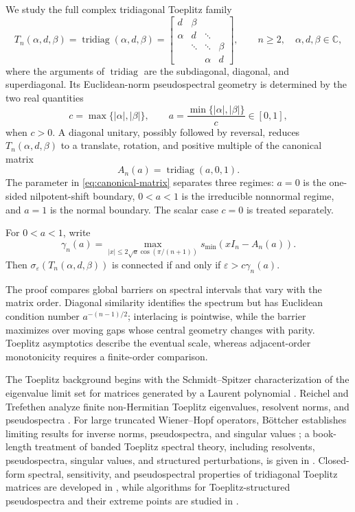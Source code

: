 \documentclass[11pt,a4paper]{article}
\numberwithin{equation}{section}
\DeclareMathOperator{\tridiag}{tridiag}
\newcommand{\C}{\mathbb C}
\begin{document}
We study the full complex tridiagonal Toeplitz family
\begin{equation}\label{eq:A-matrix}
 T_n(\alpha,d,\beta)=\tridiag(\alpha,d,\beta)
 =\begin{bmatrix}
 d&\beta\\
 \alpha&d&\ddots\\
 &\ddots&\ddots&\beta\\
 &&\alpha&d
 \end{bmatrix},
 \qquad n\geq2,\quad \alpha,d,\beta\in\C,
\end{equation}
where the arguments of \(\tridiag\) are the subdiagonal, diagonal, and
superdiagonal.  Its Euclidean-norm pseudospectral geometry is determined by
the two real quantities
\[
 c=\max\{|\alpha|,|\beta|\},
 \qquad a=\frac{\min\{|\alpha|,|\beta|\}}{c}\in[0,1],
\]
when \(c>0\).  A diagonal unitary, possibly followed by reversal, reduces
\(T_n(\alpha,d,\beta)\) to a translate, rotation, and positive multiple of
the canonical matrix
\begin{equation}\label{eq:canonical-matrix}
 A_n(a)=\tridiag(a,0,1).
\end{equation}
The parameter in \eqref{eq:canonical-matrix} separates three regimes:
\(a=0\) is the one-sided nilpotent-shift boundary, \(0<a<1\) is the
irreducible nonnormal regime, and \(a=1\) is the normal boundary.  The scalar
case \(c=0\) is treated separately.

For \(0<a<1\), write
\begin{equation}\label{eq:intro-gamma}
 \gamma_n(a)=\max_{|x|\leq2\sqrt a\cos(\pi/(n+1))}
 s_{\min}(xI_n-A_n(a)).
\end{equation}
Then \(\sigma_\varepsilon(T_n(\alpha,d,\beta))\) is connected if and only if
\(\varepsilon>c\gamma_n(a)\).

The proof compares global barriers on spectral intervals that vary with the
matrix order.  Diagonal similarity identifies the spectrum but has Euclidean
condition number \(a^{-(n-1)/2}\); interlacing is pointwise, while the barrier
maximizes over moving gaps whose central geometry changes with parity.
Toeplitz asymptotics describe the eventual scale, whereas adjacent-order
monotonicity requires a finite-order comparison.

The Toeplitz background begins with the Schmidt--Spitzer characterization of
the eigenvalue limit set for matrices generated by a Laurent polynomial
\cite{SchmidtSpitzer1960}.  Reichel and Trefethen analyze finite
non-Hermitian Toeplitz eigenvalues, resolvent norms, and pseudospectra
\cite{ReichelTrefethen1992}.  For large truncated Wiener--Hopf operators,
B\"ottcher establishes limiting results for inverse norms, pseudospectra, and
singular values \cite{Bottcher1994}; a book-length treatment of banded
Toeplitz spectral theory, including resolvents, pseudospectra, singular
values, and structured perturbations, is given in
\cite{BottcherGrudsky2005}.  Closed-form spectral, sensitivity, and
pseudospectral properties of tridiagonal Toeplitz matrices are developed in
\cite{NoschesePasquiniReichel2013}, while algorithms for Toeplitz-structured
pseudospectra and their extreme points are studied in
\cite{ButtaGuglielmiNoschese2012}.
\end{document}
